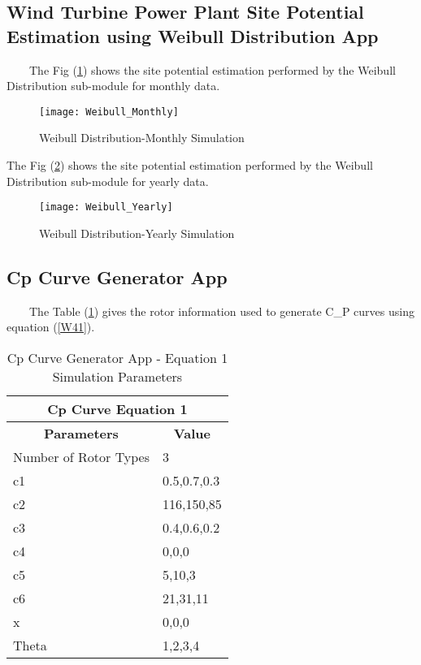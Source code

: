 \subsection{Wind Turbine Power Plant Site Potential Estimation using Weibull Distribution App}
\
\
\
\
The Fig (\ref{WinResImg1}) shows the site potential estimation performed by the Weibull Distribution sub-module for monthly data.

\begin{figure}[H]
\centering
\texttt{[image: Weibull\_Monthly]}
\caption{Weibull Distribution-Monthly Simulation }
\label{WinResImg1} %
\end{figure}

The Fig (\ref{WinResImg2}) shows the site potential estimation performed by the Weibull Distribution sub-module for yearly data.

\begin{figure}[H]
\centering
\texttt{[image: Weibull\_Yearly]}
\caption{ Weibull Distribution-Yearly Simulation }
\label{WinResImg2} %
\end{figure}

\subsection{Cp Curve Generator App}
\
\
\
\
The Table (\ref{CpCurveTab1}) gives the rotor information used to generate C_{P} curves using equation (\ref{W41}).

\begin{table}[htbp]
  \centering
  \caption{Cp Curve Generator App - Equation 1 Simulation Parameters}
    \begin{tabular}{|l|l|}
    \hline
    \multicolumn{2}{|c|}{\textbf{Cp Curve Equation 1}} \bigstrut\\
    \hline
    \multicolumn{1}{|c|}{\textbf{Parameters }} & \multicolumn{1}{c|}{\textbf{Value}} \bigstrut\\
    \hline
    \multicolumn{1}{|c|}{Number of Rotor Types} & 3 \bigstrut\\
    \hline
    c1 & 0.5,0.7,0.3 \bigstrut\\
    \hline
    c2 & 116,150,85 \bigstrut\\
    \hline
    c3 & 0.4,0.6,0.2 \bigstrut\\
    \hline
    c4 & 0,0,0 \bigstrut\\
    \hline
    c5 & 5,10,3 \bigstrut\\
    \hline
    c6 & 21,31,11 \bigstrut\\
    \hline
    x  & 0,0,0 \bigstrut\\
    \hline
    Theta & 1,2,3,4 \bigstrut\\
    \hline
    \end{tabular}%
  \label{CpCurveTab1}%
\end{table}%

